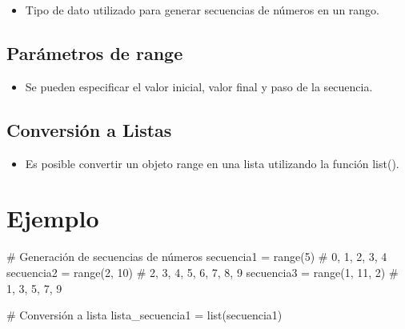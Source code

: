 \documentclass[
  a4paper,
  DIV=11,
  numbers=noendperiod,
  onepage,
  openany]{scrreprt}
\newenvironment{Shaded}{\begin{snugshade}}{\end{snugshade}}
\newcommand{\BuiltInTok}[1]{\textcolor[rgb]{0.00,0.23,0.31}{#1}}
\newcommand{\CommentTok}[1]{\textcolor[rgb]{0.37,0.37,0.37}{#1}}
\newcommand{\DecValTok}[1]{\textcolor[rgb]{0.68,0.00,0.00}{#1}}
\newcommand{\NormalTok}[1]{\textcolor[rgb]{0.00,0.23,0.31}{#1}}
\newcommand{\OperatorTok}[1]{\textcolor[rgb]{0.37,0.37,0.37}{#1}}
\providecommand{\tightlist}{%
  \setlength{\itemsep}{0pt}\setlength{\parskip}{0pt}}\usepackage{longtable,booktabs,array}
\begin{document}
\begin{itemize}
\tightlist
\item
  Tipo de dato utilizado para generar secuencias de números en un rango.
\end{itemize}

\subsection{Parámetros de range}\label{paruxe1metros-de-range}

\begin{itemize}
\tightlist
\item
  Se pueden especificar el valor inicial, valor final y paso de la
  secuencia.
\end{itemize}

\subsection{Conversión a Listas}\label{conversiuxf3n-a-listas}

\begin{itemize}
\tightlist
\item
  Es posible convertir un objeto range en una lista utilizando la
  función list().
\end{itemize}

\section{Ejemplo}\label{ejemplo-6}

\begin{Shaded}
\begin{Highlighting}[]
\CommentTok{\# Generación de secuencias de números}
\NormalTok{secuencia1 }\OperatorTok{=} \BuiltInTok{range}\NormalTok{(}\DecValTok{5}\NormalTok{)          }\CommentTok{\# 0, 1, 2, 3, 4}
\NormalTok{secuencia2 }\OperatorTok{=} \BuiltInTok{range}\NormalTok{(}\DecValTok{2}\NormalTok{, }\DecValTok{10}\NormalTok{)      }\CommentTok{\# 2, 3, 4, 5, 6, 7, 8, 9}
\NormalTok{secuencia3 }\OperatorTok{=} \BuiltInTok{range}\NormalTok{(}\DecValTok{1}\NormalTok{, }\DecValTok{11}\NormalTok{, }\DecValTok{2}\NormalTok{)   }\CommentTok{\# 1, 3, 5, 7, 9}

\CommentTok{\# Conversión a lista}
\NormalTok{lista\_secuencia1 }\OperatorTok{=} \BuiltInTok{list}\NormalTok{(secuencia1)}
\end{Highlighting}
\end{Shaded}
\end{document}
